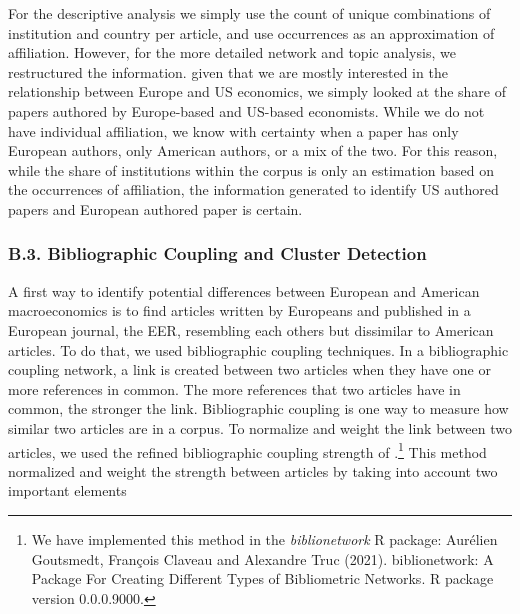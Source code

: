 \documentclass[]{elsarticle} %
\begin{document}
For the descriptive analysis we simply use the count of unique
combinations of institution and country per article, and use occurrences
as an approximation of affiliation. However, for the more detailed
network and topic analysis, we restructured the information. given that
we are mostly interested in the relationship between Europe and US
economics, we simply looked at the share of papers authored by
Europe-based and US-based economists. While we do not have individual
affiliation, we know with certainty when a paper has only European
authors, only American authors, or a mix of the two. For this reason,
while the share of institutions within the corpus is only an estimation
based on the occurrences of affiliation, the information generated to
identify US authored papers and European authored paper is certain.

\hypertarget{network}{%
\subsubsection*{B.3. Bibliographic Coupling and Cluster
Detection}\label{network}}

A first way to identify potential differences between European and
American macroeconomics is to find articles written by Europeans and
published in a European journal, the EER, resembling each others but
dissimilar to American articles. To do that, we used bibliographic
coupling techniques. In a bibliographic coupling network, a link is
created between two articles when they have one or more references in
common. The more references that two articles have in common, the
stronger the link. Bibliographic coupling is one way to measure how
similar two articles are in a corpus. To normalize and weight the link
between two articles, we used the refined bibliographic coupling
strength of \citet{shen2019}.\footnote{We have implemented this method
  in the \emph{biblionetwork} R package: Aurélien Goutsmedt, François
  Claveau and Alexandre Truc (2021). biblionetwork: A Package For
  Creating Different Types of Bibliometric Networks. R package version
  0.0.0.9000.} This method normalized and weight the strength between
articles by taking into account two important elements
\end{document}
